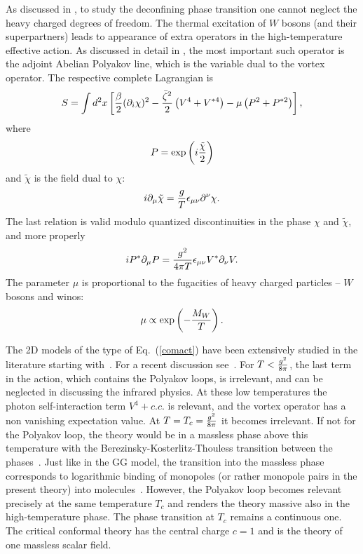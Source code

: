 \documentclass[a4paper,12pt]{article}
\begin{document}
As discussed in \cite{2,kk}, to study the deconfining phase
transition  one cannot neglect the heavy charged degrees of
freedom. The thermal excitation of $W$ bosons (and their
superpartners) leads to appearance of extra operators in the high-temperature
effective action.  As discussed in detail in
\cite{2,kk}, the most important such operator is the adjoint
Abelian Polyakov line, which is the variable dual to the vortex
operator. The respective complete Lagrangian is
\begin{equation} S=  \int d^2x\left[\frac\beta2(\partial_i\chi)^2-
{\bar\zeta^2\over 2}\left(V^4+V^{*4}\right)- \mu\left(P^2+P^{*2}\right)
\right],\label{comact}\end{equation} where
\begin{equation} P=\exp\left(i{\tilde\chi\over 2}\right) \end{equation}
and $\tilde\chi$
is the field dual to $\chi$:
 \begin{equation} i\partial_{\mu}\tilde\chi= {g\over  T}
\epsilon_{\mu\nu}\partial^\nu \chi. \label{chid} \end{equation}
The last relation is valid modulo quantized discontinuities in the
phase $\chi$ and $\tilde\chi$, and  more properly
\begin{equation}
iP^*\partial_\mu P ={g^2\over 4\pi
T}\epsilon_{\mu\nu}V^*\partial_\nu V.
\end{equation}
The parameter $\mu$ is proportional to the fugacities of heavy
charged particles -- $W$ bosons and winos:
\begin{equation}
\mu\propto \exp\left(-{M_W\over T}\right).
\end{equation}

The 2D models of the type of Eq.~(\ref{comact}) have been
extensively studied in the literature starting with~\cite{jose}.
For a recent discussion see~\cite{dorey}. For $T<{g^2\over 8\pi}$,
the last term in the action, which contains the Polyakov loops, is
irrelevant, and can be neglected in discussing the infrared
physics. At these low temperatures the photon self-interaction
term $V^4+c.c.$ is relevant, and the vortex operator has a non
vanishing expectation value. At $T=T_c={g^2\over 8\pi}$ it becomes
irrelevant. If not for the Polyakov loop, the theory would be in a
massless phase above this temperature with the
Berezinsky-Kosterlitz-Thouless transition between the
phases~\cite{bkt}. Just like in the GG model, the transition into
the massless phase corresponds to logarithmic binding of monopoles
(or rather monopole pairs in the present theory) into
molecules~\cite{nk}. However, the Polyakov loop becomes relevant
precisely at the same temperature $T_c$ and renders the theory
massive also in the high-temperature phase. The phase transition
at $T_c$ remains a continuous one. The critical conformal theory
has the central charge $c=1$ and is the theory of one massless
scalar field.
\end{document}
